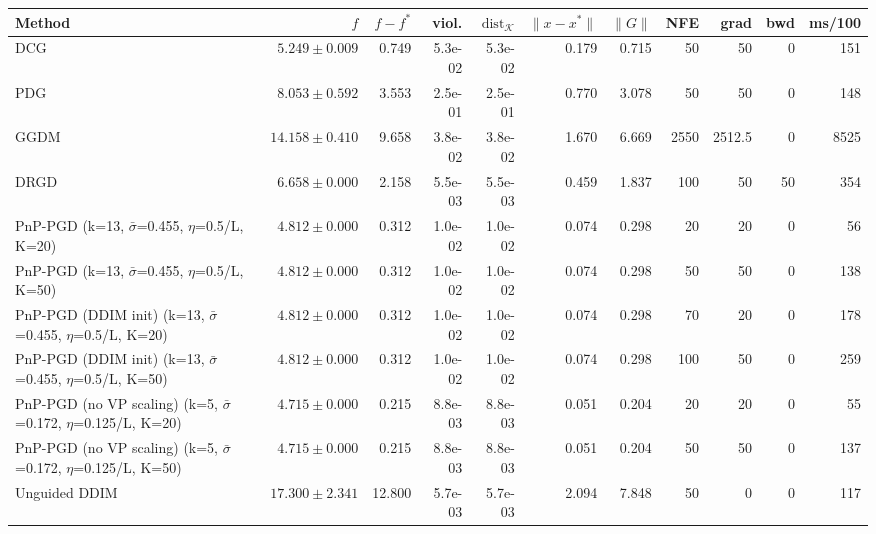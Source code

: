 \begin{tabular}{lrrrrrrrrrr}
\toprule
Method & $f$ & $f-f^*$ & viol. & $\mathrm{dist}_\mathcal{K}$ & $\|x-x^*\|$ & $\|G\|$ & NFE & grad & bwd & ms/100 \\
\midrule
DCG & $5.249\pm0.009$ & 0.749 & 5.3e-02 & 5.3e-02 & 0.179 & 0.715 & 50 & 50 & 0 & 151 \\
PDG & $8.053\pm0.592$ & 3.553 & 2.5e-01 & 2.5e-01 & 0.770 & 3.078 & 50 & 50 & 0 & 148 \\
GGDM & $14.158\pm0.410$ & 9.658 & 3.8e-02 & 3.8e-02 & 1.670 & 6.669 & 2550 & 2512.5 & 0 & 8525 \\
DRGD & $6.658\pm0.000$ & 2.158 & 5.5e-03 & 5.5e-03 & 0.459 & 1.837 & 100 & 50 & 50 & 354 \\
PnP-PGD (k=13, $\bar\sigma$=0.455, $\eta$=0.5/L, K=20) & $4.812\pm0.000$ & 0.312 & 1.0e-02 & 1.0e-02 & 0.074 & 0.298 & 20 & 20 & 0 & 56 \\
PnP-PGD (k=13, $\bar\sigma$=0.455, $\eta$=0.5/L, K=50) & $4.812\pm0.000$ & 0.312 & 1.0e-02 & 1.0e-02 & 0.074 & 0.298 & 50 & 50 & 0 & 138 \\
PnP-PGD (DDIM init) (k=13, $\bar\sigma$=0.455, $\eta$=0.5/L, K=20) & $4.812\pm0.000$ & 0.312 & 1.0e-02 & 1.0e-02 & 0.074 & 0.298 & 70 & 20 & 0 & 178 \\
PnP-PGD (DDIM init) (k=13, $\bar\sigma$=0.455, $\eta$=0.5/L, K=50) & $4.812\pm0.000$ & 0.312 & 1.0e-02 & 1.0e-02 & 0.074 & 0.298 & 100 & 50 & 0 & 259 \\
PnP-PGD (no VP scaling) (k=5, $\bar\sigma$=0.172, $\eta$=0.125/L, K=20) & $4.715\pm0.000$ & 0.215 & 8.8e-03 & 8.8e-03 & 0.051 & 0.204 & 20 & 20 & 0 & 55 \\
PnP-PGD (no VP scaling) (k=5, $\bar\sigma$=0.172, $\eta$=0.125/L, K=50) & $4.715\pm0.000$ & 0.215 & 8.8e-03 & 8.8e-03 & 0.051 & 0.204 & 50 & 50 & 0 & 137 \\
Unguided DDIM & $17.300\pm2.341$ & 12.800 & 5.7e-03 & 5.7e-03 & 2.094 & 7.848 & 50 & 0 & 0 & 117 \\
\bottomrule
\end{tabular}

